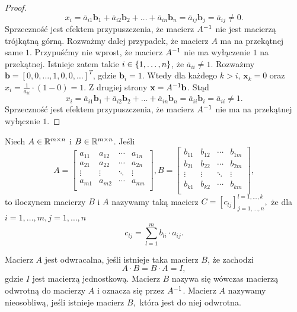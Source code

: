 \documentclass[12pt,a4paper]{report}
\newcommand{\vr}[1]{\mathbf{#1}}
\newcommand{\mx}[1]{{#1}}
\begin{document}
\begin{proof}
$$
x_{i} = \overline{a}_{i1} \vr{b}_{1} + \overline{a}_{i2} \vr{b}_{2} + \ldots + \overline{a}_{in} \vr{b}_{n} = \overline{a}_{ij} \vr{b}_{j} = \overline{a}_{ij} \neq 0.
$$ 
Sprzeczność jest efektem przypuszczenia, że macierz $\inverse{\mx{A}}$ nie jest macierzą trójkątną górną.
Rozważmy dalej przypadek, że macierz $\mx{A}$ ma na przekątnej same $1$. Przypuśćmy nie wprost, że macierz $\inverse{\mx{A}}$ nie ma wyłączenie $1$ na przekątnej. Istnieje zatem takie $ i \in \left\lbrace {1, \ldots, n} \right\rbrace$, że $\overline{a}_{ii} \neq 1$. Rozważmy $\vr{b} = [0,0, \ldots, 1,0,0, \ldots]^{T}$, gdzie $\vr{b}_{i} = 1$. Wtedy dla każdego $k>i$, $\vr{x}_{k} = 0$ oraz $x_{i} = \frac{1}{a_{ii}} \cdot(1 - 0 ) = 1$. Z drugiej strony $\vr{x} = \inverse{\mx{A}} \vr{b}$. Stąd 
$$
x_{i} = \overline{a}_{i1} \vr{b}_{1} + \overline{a}_{i2} \vr{b}_{2} + \ldots + \overline{a}_{in} \vr{b}_{n} = \overline{a}_{ii} \vr{b}_{i} = \overline{a}_{ii} \neq 1.
$$
Sprzeczność jest efektem przypuszczenia, że macierz $\inverse{\mx{A}}$ nie ma na przekątnej wyłącznie $1$.

\end{proof}


\begin{definition}
Niech $\mx{A}\in \setR^{m \times n }$ i $\mx{B}\in \setR^{m \times n }$. Jeśli
$$
\mx{A} = \begin{bmatrix}
 a_{11} & a_{12} & \cdots & a_{1n} \\
         a_{21} & a_{22} & \cdots & a_{2n} \\
         \vdots & \vdots & \ddots & \vdots \\
         a_{m1} & a_{m2} & \cdots & a_{mn} \\
\end{bmatrix}, \mx{B} = \begin{bmatrix}
 b_{11} & b_{12} & \cdots & b_{1m} \\
         b_{21} & b_{22} & \cdots & b_{2m} \\
         \vdots & \vdots & \ddots & \vdots \\
         b_{k1} & b_{k2} & \cdots & b_{km} \\
\end{bmatrix},
$$ 
to iloczynem macierzy $\mx{B}$ i $\mx{A}$ nazywamy taką macierz $\mx{C} = [c_{lj}]_{j=1,\ldots,n}^{l=1,\ldots,k},$ że dla $i=1,\ldots,m, j=1,\ldots,n $
$$
c_{lj}= \sum_{l=1}^{m} b_{li} \cdot a_{ij}.
$$
\end{definition}


\begin{definition} 
Macierz $\mx{A}$ jest odwracalna, jeśli istnieje taka macierz $\mx{B}$, że zachodzi
$$
\mx{A}\cdot \mx{B}=\mx{B}\cdot \mx{A}=\mx{I},
$$ 
gdzie $\mx{I}$ jest macierzą jednostkową. Macierz $\mx{B}$ nazywa się wówczas macierzą odwrotną do macierzy $\mx{A}$ i oznacza się przez  $\inverse{\mx{A}}$. Macierz $\mx{A}$ nazywamy nieosobliwą, jeśli istnieje macierz $\mx{B},$ która jest do niej odwrotna.

\end{definition}
\end{document}
